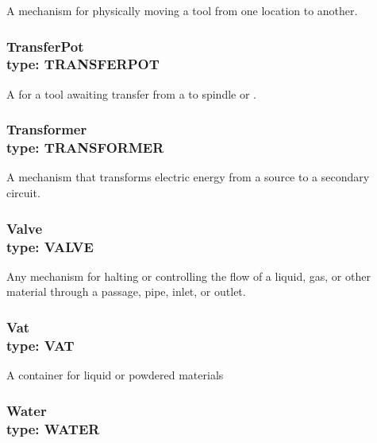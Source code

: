 A mechanism for physically moving a tool from one location to another.



\subsubsection[TransferPot]{TransferPot \\ {\small type: TRANSFER\textunderscore POT}}
\label{sec:TransferPot}



A  for a tool awaiting transfer from a  to \gls{spindle} or .



\subsubsection[Transformer]{Transformer \\ {\small type: TRANSFORMER}}
\label{sec:Transformer}



A mechanism that transforms electric energy from a source to a secondary circuit.



\subsubsection[Valve]{Valve \\ {\small type: VALVE}}
\label{sec:Valve}



Any mechanism for halting or controlling the flow of a liquid, gas, or other material through a passage, pipe, inlet, or outlet.



\subsubsection[Vat]{Vat \\ {\small type: VAT}}
\label{sec:Vat}



A container for liquid or powdered materials



\subsubsection[Water]{Water \\ {\small type: WATER}}
\label{sec:Water}



